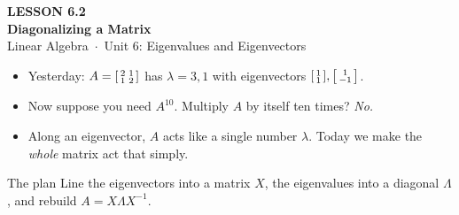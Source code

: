 \documentclass[aspectratio=169, 11pt]{beamer}
\begin{document}
{
\begin{frame}[plain]
  \vspace{2.8cm}\hspace{0.55cm}%
  \begin{minipage}{0.9\textwidth}
    {\color{goldacc}\bfseries\small LESSON 6.2}\\[0.5cm]
    {\color{white}\bfseries\LARGE Diagonalizing a Matrix}\\[1.0cm]
    {\color{blushmid}\small Linear Algebra~$\cdot$~Unit 6: Eigenvalues and Eigenvectors}
  \end{minipage}
\end{frame}
}

\begin{frame}[t, plain]
  \begin{itemize}
    \setlength{\itemsep}{7pt}
    \item Yesterday: $A=\begin{bsmallmatrix} 2 & 1\\ 1 & 2 \end{bsmallmatrix}$ has $\lambda=3,1$ with
          eigenvectors $\begin{bsmallmatrix}1\\1\end{bsmallmatrix},\begin{bsmallmatrix}1\\-1\end{bsmallmatrix}$.
    \item Now suppose you need $A^{10}$. Multiply $A$ by itself ten times? \emph{No.}
    \item Along an eigenvector, $A$ acts like a single number $\lambda$. Today we make the \emph{whole}
          matrix act that simply.
  \end{itemize}
  \begin{block}{The plan}
    Line the eigenvectors into a matrix $X$, the eigenvalues into a diagonal $\Lambda$, and rebuild
    $A=X\Lambda X^{-1}$.
  \end{block}
\end{frame}
\end{document}
